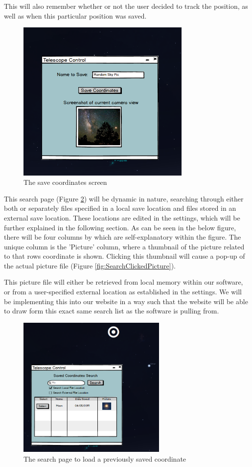 \documentclass[12pt]{article}
\begin{document}
This will also remember whether or not the user decided to track the position, as well as when this particular position was saved.


\begin{figure}[h]
	\centering
	\includegraphics[width=0.60\linewidth, height=8cm]{Save}
	\caption{The save coordinates screen}
	\label{fig:Save}
\end{figure}

This search page (Figure \ref{fig:SearchPage}) will be dynamic in nature, searching through either both or separately files specified in a local save location and files stored in an external save location. These locations are edited in the settings, which will be further explained in the following section. As can be seen in the below figure, there will be four columns by which are self-explanatory within the figure. The unique column is the 'Picture' column, where a thumbnail of the picture related to that rows coordinate is shown. Clicking this thumbnail will cause a pop-up of the actual picture file (Figure \ref{fig:SearchClickedPicture}).

This picture file will either be retrieved from local memory within our software, or from a user-specified external location as established in the settings. We will be implementing this into our website in a way such that the website will be able to draw form this exact same search list as the software is pulling from.

\begin{figure}[h]
	\centering
	\includegraphics[width=0.55\linewidth, height=7.0cm]{SearchPage}
	\caption{The search page to load a previously saved coordinate}
	\label{fig:SearchPage}
\end{figure}
\end{document}
